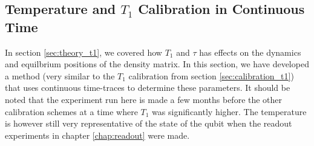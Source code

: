\subsection{Temperature and $T_1$ Calibration in Continuous Time}\label{sec:continuous_calibratino}
In section \ref{sec:theory_t1}, we covered how $T_1$ and $\tau$ has effects on the dynamics and equilbrium positions of the density matrix. In this section, we have developed a method (very similar to the $T_1$ calibration from section \ref{sec:calibration_t1}) that uses continuous time-traces to determine these parameters. It should be noted that the experiment run here is made a few months before the other calibration schemes at a time where $T_1$ was significantly higher. The temperature is however still very representative of the state of the qubit when the readout experiments in chapter \ref{chap:readout} were made.

